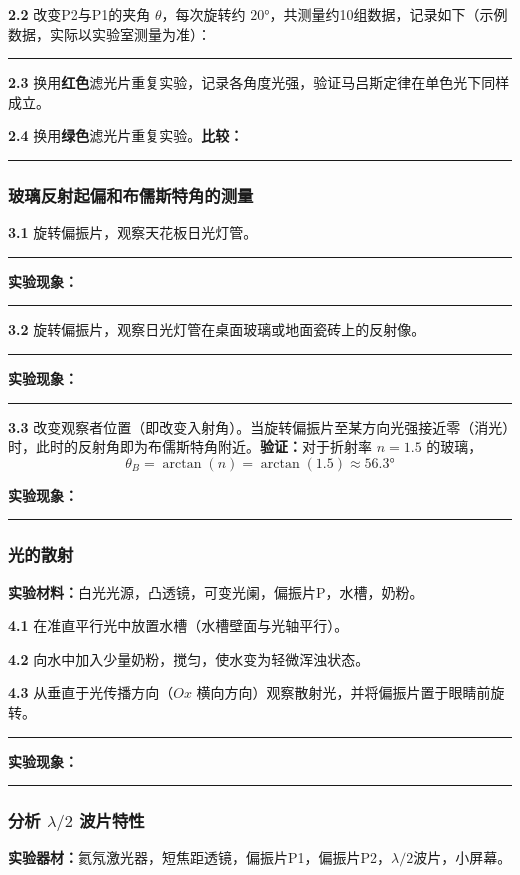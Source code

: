 \documentclass[dvipsnames, svgnames,a4paper,11pt]{article}
\newcommand{\recordblank}[1]{%
  \par\noindent\rule{0.95\linewidth}{0pt}\rule{0pt}{#1}\par}
\begin{document}
\textbf{2.2} 改变P2与P1的夹角 $\theta$，每次旋转约 $20°$，共测量约10组数据，记录如下（示例数据，实际以实验室测量为准）：

\recordblank{6cm}

\textbf{2.3} 换用\textbf{红色}滤光片重复实验，记录各角度光强，验证马吕斯定律在单色光下同样成立。

\textbf{2.4} 换用\textbf{绿色}滤光片重复实验。\textbf{比较：}\par
\recordblank{2.8cm}

\clearpage

\subsubsection{玻璃反射起偏和布儒斯特角的测量}

\textbf{3.1} 旋转偏振片，观察天花板日光灯管。
\recordblank{5cm}
\par\noindent\textbf{实验现象：}\par
\recordblank{4cm}

\textbf{3.2} 旋转偏振片，观察日光灯管在桌面玻璃或地面瓷砖上的反射像。
\recordblank{6cm}
\par\noindent\textbf{实验现象：}\par
\recordblank{4cm}

\textbf{3.3} 改变观察者位置（即改变入射角）。当旋转偏振片至某方向光强接近零（消光）时，此时的反射角即为布儒斯特角附近。\textbf{验证：}对于折射率 $n = 1.5$ 的玻璃，
\[
\theta_B = \arctan(n) = \arctan(1.5) \approx 56.3°
\]
\par\noindent\textbf{实验现象：}\par
\recordblank{4cm}

\subsubsection{光的散射}
\textbf{实验材料：}白光光源，凸透镜，可变光阑，偏振片P，水槽，奶粉。

\textbf{4.1} 在准直平行光中放置水槽（水槽壁面与光轴平行）。

\textbf{4.2} 向水中加入少量奶粉，搅匀，使水变为轻微浑浊状态。

\textbf{4.3} 从垂直于光传播方向（$Ox$ 横向方向）观察散射光，并将偏振片置于眼睛前旋转。
\recordblank{6cm}
\par\noindent\textbf{实验现象：}\par
\recordblank{4cm}

\subsubsection{分析 $\lambda/2$ 波片特性}
\textbf{实验器材：}氦氖激光器，短焦距透镜，偏振片P1，偏振片P2，$\lambda/2$波片，小屏幕。
\end{document}
